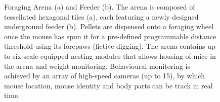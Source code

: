 
\begin{figure}
    \centering
    \hfill
    \caption{Foraging Arena (a) and Feeder (b).
    The arena is composed of tessellated hexagonal tiles (a), each featuring a
    newly designed underground feeder (b).
    Pellets are dispensed onto a foraging wheel once the mouse has spun it for
    a pre-defined programmable distance threshold using its forepaws (fictive
    digging).
    The arena contains up to six scale-equipped nesting modules that allows
    housing of mice in the arena and weight monitoring.
    Behavioural monitoring is achieved by an array of high-speed cameras (up to
    15), by which mouse location, mouse identity and body parts can be track in
    real time.
    }
\label{fig:arena}
\end{figure}
